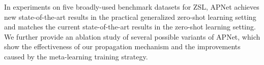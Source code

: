 \documentclass[letterpaper]{article} %
\begin{document}

In experiments on five broadly-used benchmark datasets for ZSL, APNet achieves new state-of-the-art results in the practical generalized zero-shot learning setting and matches the current state-of-the-art results in the zero-shot learning setting.
We further provide an ablation study of several possible variants of APNet, which show the effectiveness of our propagation mechanism and the improvements caused by the meta-learning training strategy.
\end{document}
